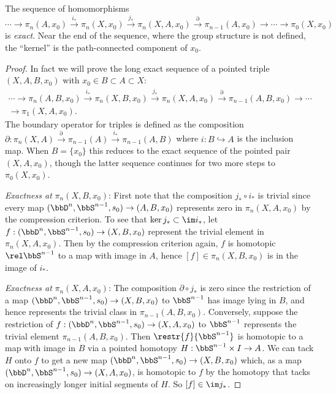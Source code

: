\begin{thm}\label{thm long exact seq of homotopy}
    The sequence of homomorphisms
    \[\cdots \to \pi_n(A,x_0)\overset{i_\ast}{\to}\pi_n(X,x_0)\overset{j_\ast}{\to}\pi_n(X,A,x_0)\overset{\partial}{\to}\pi_{n-1}(A,x_0)\to \cdots \to \pi_0(X,x_0)\]
    is \emph{exact}. Near the end of the sequence, where the group structure is not defined, the ``kernel'' is the path-connected component of $x_0$.
\end{thm}
\begin{proof}
    In fact we will prove the long exact sequence of a pointed triple $(X,A,B,x_0)$ with $x_0\in B\subset A\subset X$:
    \begin{multline}
        \cdots \to \pi_n(A,B,x_0)\overset{i_\ast}{\to}\pi_n(X,B,x_0)\overset{j_\ast}{\to}\pi_n(X,A,x_0)\overset{\partial}{\to}\pi_{n-1}(A,B,x_0)\to \cdots \\ \to \pi_1(X,A,x_0).
    \end{multline}
    The boundary operator for triples is defined as the composition $\partial:\pi_n(X,A)\overset{\partial}{\to} \pi_{n-1}(A)\overset{i_\ast}{\to} \pi_{n-1}(A,B)$ where $i:B\hookrightarrow A$ is the inclusion map. When $B=\{x_0\}$ this reduces to the exact sequence of the pointed pair $(X,A,x_0)$, though the latter sequence continues for two more steps to $\pi_0(X,x_0)$.

    \emph{Exactness at} $\pi_n(X,B,x_0)$: First note that the composition $j_\ast\circ i_\ast$ is trivial since every map $(\bbD^n,\bbS^{n-1},s_0)\to (A,B,x_0)$ represents zero in $\pi_n(X,A,x_0)$ by the compression criterion. To see that $\ker j_\ast \subset \im i_\ast$, let $f:(\bbD^n,\bbS^{n-1},s_0)\to (X,B,x_0)$ represent the trivial element in $\pi_n(X,A,x_0)$. Then by the compression criterion again, $f$ is homotopic $\rel \bbS^{n-1}$ to a map with image in $A$, hence $[f]\in \pi_n(X,B,x_0)$ is in the image of $i_\ast$.

    \emph{Exactness at} $\pi_n(X,A,x_0)$: The composition $\partial\circ j_\ast$ is zero since the restriction of a map $(\bbD^n,\bbS^{n-1},s_0)\to (X,B,x_0)$ to $\bbS^{n-1}$ has image lying in $B$, and hence represents the trivial class in $\pi_{n-1}(A,B,x_0)$. Conversely, suppose the restriction of $f:(\bbD^n,\bbS^{n-1},s_0)\to (X,A,x_0)$ to $\bbS^{n-1}$ represents the trivial element $\pi_{n-1}(A,B,x_0)$. Then $\restr{f}{\bbS^{n-1}}$ is homotopic to a map with image in $B$ via a pointed homotopy $H:\bbS^{n-1}\times I \to A$. We can tack $H$ onto $f$ to get a new map $(\bbD^n,\bbS^{n-1},s_0)\to (X,B,x_0)$ which, as a map $(\bbD^n,\bbS^{n-1},s_0)\to (X,A,x_0)$, is homotopic to $f$ by the homotopy that tacks on increasingly longer initial segments of $H$. So $[f]\in \im j_\ast$.


\end{proof}
